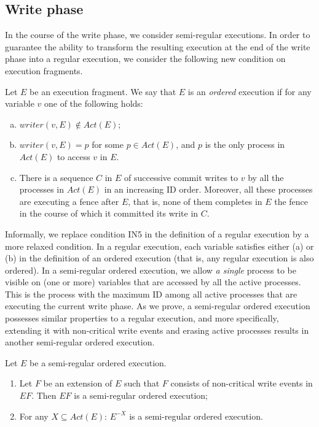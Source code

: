 \subsection{Write phase}
In the course of the write phase, we consider semi-regular executions. In order to guarantee the ability to transform the resulting execution at the end of the write phase into a regular execution, we consider the following new condition on execution fragments.

\begin{definition}
\label{def:ordered-exec}
	Let $E$ be an execution fragment. We say that $E$ is an \emph{ordered} execution if for any variable $v$ one of the following holds:
	\begin{enumerate}[(a)]
		\item $writer(v,E) \notin Act(E)$;
		\item $writer(v,E) = p$ for some $p \in Act(E)$, and $p$ is the only process in $Act(E)$ to access $v$ in $E$.
		\item There is a sequence $C$ in $E$ of successive commit writes to $v$ by all the processes in $Act(E)$ in an increasing ID order. Moreover, all these processes are executing a fence after $E$, that is, none of them completes in $E$ the fence in the course of which it committed its write in $C$.
	\end{enumerate}
\end{definition}

Informally, we replace condition IN5 in the definition of a regular execution by a more relaxed condition. In a regular execution, each variable satisfies either (a) or (b) in the definition of an ordered execution (that is, any regular execution is also ordered). In a semi-regular ordered execution, we allow \emph{a single} process to be visible on (one or more) variables that are accessed by all the active processes. This is the process with the maximum ID among all active processes that are executing the current write phase. As we prove, a semi-regular ordered execution possesses similar properties to a regular execution, and more specifically, extending it with non-critical write events and erasing active processes results in another semi-regular ordered execution.


\begin{claim-num} \label{claim: pseudo-regular ordered execution}
	Let $E$ be a semi-regular ordered execution.
	\begin{enumerate}
		\item Let $F$ be an extension of $E$ such that $F$ consists of non-critical write events in $E F$. Then $E F$ is a semi-regular ordered execution;
		\item For any $X \subseteq Act(E)$: $E^{-X}$ is a semi-regular ordered execution.
	\end{enumerate}
\end{claim-num}

